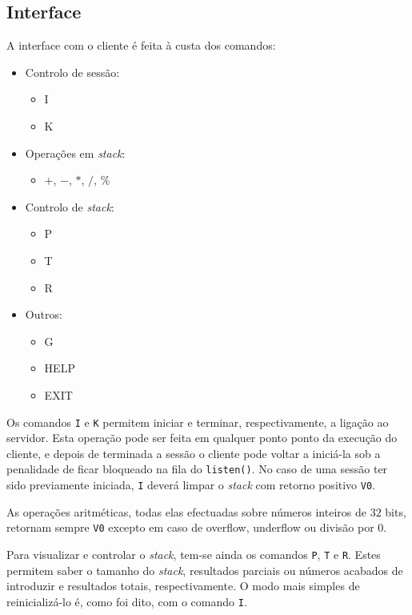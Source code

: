 \clearpage
\subsection{Interface\label{sec:cliente_interface}}

	\indent\indent A interface com o cliente é feita à custa dos comandos:

	\begin{itemize}
		\setlength{\parskip}{-3pt}
		\item{Controlo de sessão:}\begin{itemize}
			\setlength{\parskip}{-3pt}
			\item{I}
			\item{K}
		\end{itemize}
		\item{Operações em \emph{stack}:}\begin{itemize}
			\setlength{\parskip}{-3pt}
			\item{$+$, $-$, $*$, $/$, $\%$}
		\end{itemize}
		\item{Controlo de \emph{stack}:}\begin{itemize}
			\setlength{\parskip}{-3pt}
			\item{P}
			\item{T}
			\item{R}
		\end{itemize}
		\item{Outros:}\begin{itemize}
			\setlength{\parskip}{-3pt}
			\item{G}
			\item{HELP}
			\item{EXIT}
		\end{itemize}
	\end{itemize}

	Os comandos \verb|I| e \verb|K| permitem iniciar e terminar, respectivamente, a ligação ao servidor.
	Esta operação pode ser feita em qualquer ponto ponto da execução do cliente, e depois de terminada a sessão o cliente pode voltar a iniciá-la sob a penalidade de ficar bloqueado na fila do \verb|listen()|.
	No caso de uma sessão ter sido previamente iniciada, \verb|I| deverá limpar o \emph{stack} com retorno positivo \verb|V0|.
	
	As operações aritméticas, todas elas efectuadas sobre números inteiros de $32$ bits, retornam sempre \verb|V0| excepto em caso de overflow, underflow ou divisão por $0$.

	Para visualizar e controlar o \emph{stack}, tem-se ainda os comandos \verb|P|, \verb|T| e \verb|R|.
	Estes permitem saber o tamanho do \emph{stack}, resultados parciais ou números acabados de introduzir e resultados totais, respectivamente.
	O modo mais simples de reinicializá-lo é, como foi dito, com o comando \verb|I|.
	
